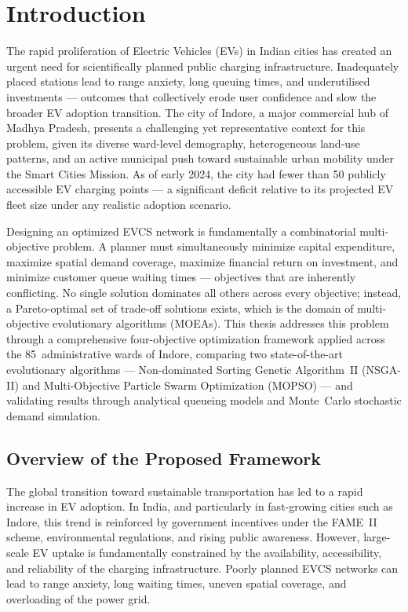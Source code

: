 
\section{Introduction}

The rapid proliferation of Electric Vehicles (EVs) in Indian cities has created an
urgent need for scientifically planned public charging infrastructure. Inadequately
placed stations lead to range anxiety, long queuing times, and underutilised
investments --- outcomes that collectively erode user confidence and slow the
broader EV adoption transition. The city of Indore, a major commercial hub of
Madhya Pradesh, presents a challenging yet representative context for this problem,
given its diverse ward-level demography, heterogeneous land-use patterns, and
an active municipal push toward sustainable urban mobility under the Smart Cities
Mission. As of early 2024, the city had fewer than 50 publicly accessible EV
charging points --- a significant deficit relative to its projected EV fleet size
under any realistic adoption scenario.

Designing an optimized EVCS network is fundamentally a combinatorial
multi-objective problem. A planner must simultaneously minimize capital
expenditure, maximize spatial demand coverage, maximize financial return on
investment, and minimize customer queue waiting times --- objectives that are
inherently conflicting. No single solution dominates all others across every
objective; instead, a Pareto-optimal set of trade-off solutions exists, which
is the domain of multi-objective evolutionary algorithms (MOEAs). This thesis
addresses this problem through a comprehensive four-objective optimization
framework applied across the 85~administrative wards of Indore, comparing
two state-of-the-art evolutionary algorithms --- Non-dominated Sorting Genetic
Algorithm~II (NSGA-II) and Multi-Objective Particle Swarm Optimization
(MOPSO) --- and validating results through analytical queueing models and
Monte~Carlo stochastic demand simulation.

\subsection{Overview of the Proposed Framework}
\label{sec:intro_overview}

The global transition toward sustainable transportation has led to a rapid
increase in EV adoption. In India, and particularly in fast-growing cities
such as Indore, this trend is reinforced by government incentives under the
FAME~II scheme, environmental regulations, and rising public awareness.
However, large-scale EV uptake is fundamentally constrained by the
availability, accessibility, and reliability of the charging infrastructure.
Poorly planned EVCS networks can lead to range anxiety, long waiting times,
uneven spatial coverage, and overloading of the power grid.

